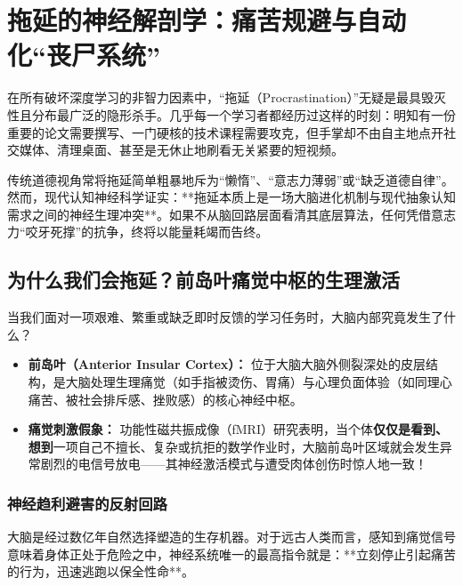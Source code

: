 \documentclass[12pt,a4paper,openany]{ctexbook}
\begin{document}
\chapter{拖延的神经解剖学：痛苦规避与自动化“丧尸系统”}

在所有破坏深度学习的非智力因素中，“拖延（Procrastination）”无疑是最具毁灭性且分布最广泛的隐形杀手。几乎每一个学习者都经历过这样的时刻：明知有一份重要的论文需要撰写、一门硬核的技术课程需要攻克，但手掌却不由自主地点开社交媒体、清理桌面、甚至是无休止地刷看无关紧要的短视频。

传统道德视角常将拖延简单粗暴地斥为“懒惰”、“意志力薄弱”或“缺乏道德自律”。然而，现代认知神经科学证实：**拖延本质上是一场大脑进化机制与现代抽象认知需求之间的神经生理冲突**。如果不从脑回路层面看清其底层算法，任何凭借意志力“咬牙死撑”的抗争，终将以能量耗竭而告终。

\section{为什么我们会拖延？前岛叶痛觉中枢的生理激活}

当我们面对一项艰难、繁重或缺乏即时反馈的学习任务时，大脑内部究竟发生了什么？

\begin{keypoint}[拖延的神经生理机制]
\begin{itemize}
    \item \textbf{前岛叶（Anterior Insular Cortex）：} 位于大脑大脑外侧裂深处的皮层结构，是大脑处理生理痛觉（如手指被烫伤、胃痛）与心理负面体验（如同理心痛苦、被社会排斥感、挫败感）的核心神经中枢。
    \item \textbf{痛觉刺激假象：} 功能性磁共振成像（fMRI）研究表明，当个体\textbf{仅仅是看到、想到}一项自己不擅长、复杂或抗拒的数学作业时，大脑前岛叶区域就会发生异常剧烈的电信号放电——其神经激活模式与遭受肉体创伤时惊人地一致！
\end{itemize}
\end{keypoint}

\subsection*{神经趋利避害的反射回路}

大脑是经过数亿年自然选择塑造的生存机器。对于远古人类而言，感知到痛觉信号意味着身体正处于危险之中，神经系统唯一的最高指令就是：**立刻停止引起痛苦的行为，迅速逃跑以保全性命**。
\end{document}
